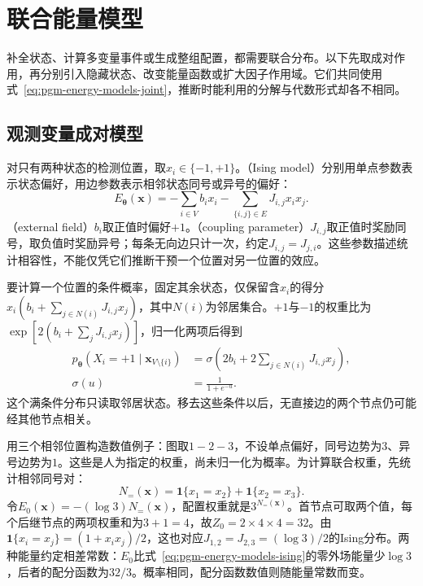 \section{联合能量模型}
\label{sec:pgm-energy-models-joint-models}

补全状态、计算多变量事件或生成整组配置，都需要联合分布。以下先取成对作用，再分别引入隐藏状态、改变能量函数或扩大因子作用域。它们共同使用式~\eqref{eq:pgm-energy-models-joint}，推断时能利用的分解与代数形式却各不相同。

\subsection{观测变量成对模型}
\label{sec:pgm-energy-models-pairwise}

对只有两种状态的检测位置，取$x_i\in\{-1,+1\}$。（Ising model）分别用单点参数表示状态偏好，用边参数表示相邻状态同号或异号的偏好：
\begin{equation}
  E_{\bm{\theta}}(\bm{x})
    =-\sum_{i\in V}b_ix_i
     -\sum_{\{i,j\}\in E}J_{i,j}x_ix_j.
  \label{eq:pgm-energy-models-ising}
\end{equation}
（external field）$b_i$取正值时偏好$+1$。（coupling parameter）$J_{i,j}$取正值时奖励同号，取负值时奖励异号；每条无向边只计一次，约定$J_{i,j}=J_{j,i}$。这些参数描述统计相容性，不能仅凭它们推断干预一个位置对另一位置的效应。

要计算一个位置的条件概率，固定其余状态，仅保留含$x_i$的得分$x_i(b_i+\sum_{j\in N(i)}J_{i,j}x_j)$，其中$N(i)$为邻居集合。$+1$与$-1$的权重比为$\exp[2(b_i+\sum_jJ_{i,j}x_j)]$，归一化两项后得到
\begin{equation}
  \begin{aligned}
    p_{\bm{\theta}}(X_i=+1\mid\bm{x}_{V\setminus\{i\}})
      &=\sigma\!\left(2b_i+
           2\sum_{j\in N(i)}J_{i,j}x_j\right),\\
    \sigma(u)&=\frac{1}{1+e^{-u}}.
  \end{aligned}
  \label{eq:pgm-energy-models-ising-conditional}
\end{equation}
这个满条件分布只读取邻居状态。移去这些条件以后，无直接边的两个节点仍可能经其他节点相关。

用三个相邻位置构造数值例子：图取$1-2-3$，不设单点偏好，同号边势为$3$、异号边势为$1$。这些是人为指定的权重，尚未归一化为概率。为计算联合权重，先统计相邻同号对：
\[
  N_{=}(\bm{x})
   =\mathbf{1}\{x_1=x_2\}+\mathbf{1}\{x_2=x_3\}.
\]
令$E_0(\bm{x})=-(\log3)N_{=}(\bm{x})$，配置权重就是$3^{N_{=}(\bm{x})}$。首节点可取两个值，每个后继节点的两项权重和为$3+1=4$，故$Z_0=2\times4\times4=32$。由$\mathbf{1}\{x_i=x_j\}=(1+x_ix_j)/2$，这也对应$J_{1,2}=J_{2,3}=(\log3)/2$的Ising分布。两种能量约定相差常数：$E_0$比式~\eqref{eq:pgm-energy-models-ising}的零外场能量少$\log3$，后者的配分函数为$32/3$。概率相同，配分函数数值则随能量常数而变。

